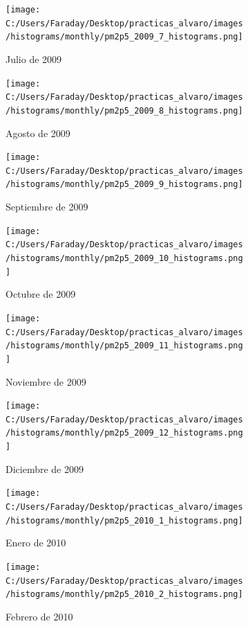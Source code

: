 \documentclass[12pt]{article}
\begin{document}
\newpage

\begin{figure}[H]
\centering
\begin{subfigure}[h]{0.45\textwidth}
\texttt{[image: C:/Users/Faraday/Desktop/practicas\_alvaro/images/histograms/monthly/pm2p5\_2009\_7\_histograms.png]}
\caption{Julio de 2009}
\label{fig:hist-mon-4-7-2009}
\end{subfigure}
%
\begin{subfigure}[H]{0.45\textwidth}
\texttt{[image: C:/Users/Faraday/Desktop/practicas\_alvaro/images/histograms/monthly/pm2p5\_2009\_8\_histograms.png]}
\caption{Agosto de 2009}
\label{fig:hist-mon-4-8-2009}
\end{subfigure}
\caption{}
\end{figure}

\begin{figure}[H]
\centering
\begin{subfigure}[h]{0.45\textwidth}
\texttt{[image: C:/Users/Faraday/Desktop/practicas\_alvaro/images/histograms/monthly/pm2p5\_2009\_9\_histograms.png]}
\caption{Septiembre de 2009}
\label{fig:hist-mon-4-9-2009}
\end{subfigure}
%
\begin{subfigure}[H]{0.45\textwidth}
\texttt{[image: C:/Users/Faraday/Desktop/practicas\_alvaro/images/histograms/monthly/pm2p5\_2009\_10\_histograms.png]}
\caption{Octubre de 2009}
\label{fig:hist-mon-4-10-2009}
\end{subfigure}
\caption{}
\end{figure}

\begin{figure}[H]
\centering
\begin{subfigure}[h]{0.45\textwidth}
\texttt{[image: C:/Users/Faraday/Desktop/practicas\_alvaro/images/histograms/monthly/pm2p5\_2009\_11\_histograms.png]}
\caption{Noviembre de 2009}
\label{fig:hist-mon-4-11-2009}
\end{subfigure}
%
\begin{subfigure}[H]{0.45\textwidth}
\texttt{[image: C:/Users/Faraday/Desktop/practicas\_alvaro/images/histograms/monthly/pm2p5\_2009\_12\_histograms.png]}
\caption{Diciembre de 2009}
\label{fig:hist-mon-4-12-2009}
\end{subfigure}
\caption{}
\end{figure}

\newpage

\begin{figure}[H]
\centering
\begin{subfigure}[h]{0.45\textwidth}
\texttt{[image: C:/Users/Faraday/Desktop/practicas\_alvaro/images/histograms/monthly/pm2p5\_2010\_1\_histograms.png]}
\caption{Enero de 2010}
\label{fig:hist-mon-4-1-2010}
\end{subfigure}
%
\begin{subfigure}[H]{0.45\textwidth}
\texttt{[image: C:/Users/Faraday/Desktop/practicas\_alvaro/images/histograms/monthly/pm2p5\_2010\_2\_histograms.png]}
\caption{Febrero de 2010}
\label{fig:hist-mon-4-2-2010}
\end{subfigure}
\caption{}
\end{figure}
\end{document}
